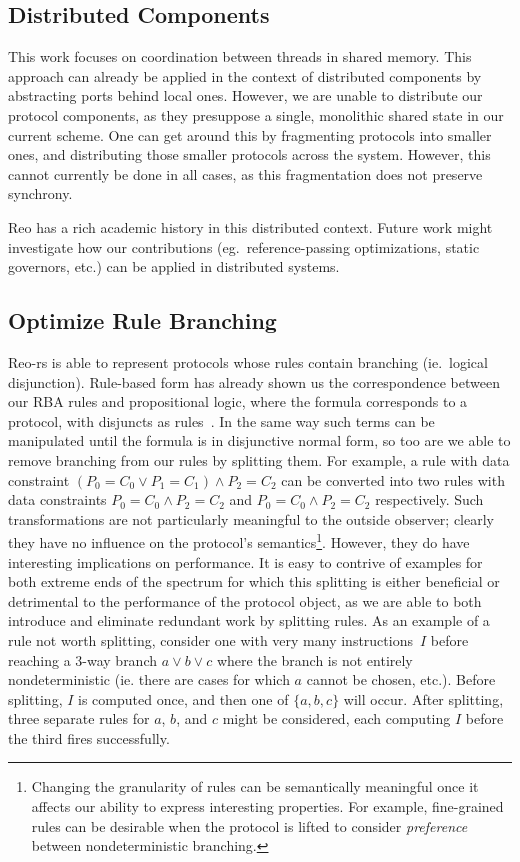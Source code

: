 \subsection{Distributed Components}
This work focuses on coordination between threads in shared memory. This approach can already be applied in the context of distributed components by abstracting ports behind local ones. However, we are unable to distribute our protocol components, as they presuppose a single, monolithic shared state in our current scheme. One can get around this by fragmenting protocols into smaller ones, and distributing those smaller protocols across the system. However, this cannot currently be done in all cases, as this fragmentation does not preserve synchrony. 

Reo has a rich academic history in this distributed context. Future work might investigate how our contributions (eg.\ reference-passing optimizations, static governors, etc.) can be applied in distributed systems.


\subsection{Optimize Rule Branching}
\label{sec:future_branches}
Reo-rs is able to represent protocols whose rules contain branching (ie.\ logical disjunction). Rule-based form has already shown us the correspondence between our RBA rules and propositional logic, where the formula corresponds to a protocol, with disjuncts as rules~\cite{dokter2018rule}. In the same way such terms can be manipulated until the formula is in disjunctive normal form, so too are we able to remove branching from our rules by splitting them. For example, a rule with data constraint $(P_0=C_0\vee{}P_1=C_1)\wedge{}P_2=C_2$ can be converted into two rules with data constraints $P_0=C_0\wedge{}P_2=C_2$ and $P_0=C_0\wedge{}P_2=C_2$ respectively. Such transformations are not particularly meaningful to the outside observer; clearly they have  no influence on the protocol's semantics\footnote{Changing the granularity of rules can be semantically meaningful once it affects our ability to express interesting properties. For example, fine-grained rules can be desirable when the protocol is lifted to consider \textit{preference} between nondeterministic branching.}. However, they do have interesting implications on performance. It is easy to contrive of examples for both extreme ends of the spectrum for which this splitting is either beneficial or detrimental to the performance of the protocol object, as we are able to both introduce and eliminate redundant work by splitting rules. As an example of a rule not worth splitting, consider one with very many instructions~$I$ before reaching a 3-way branch $a\vee{}b\vee{}c$ where the branch is not entirely nondeterministic (ie. there are cases for which $a$ cannot be chosen, etc.). Before splitting, $I$ is computed once, and then one of $\{a,b,c\}$ will occur. After splitting, three separate rules for $a$, $b$, and $c$ might be considered, each computing $I$ before the third fires successfully.

